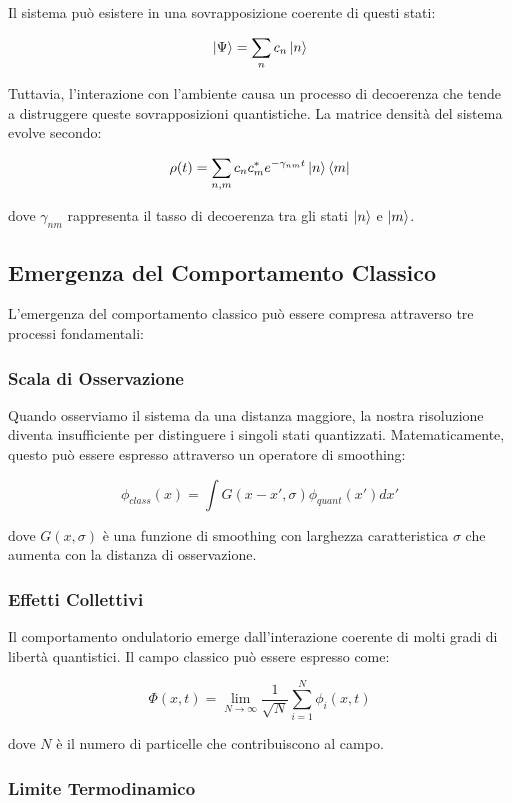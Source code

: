 \documentclass[a4paper,11pt]{article}
\begin{document}
Il sistema può esistere in una sovrapposizione coerente di questi stati:

\[\ket{\Psi} = \sum_n c_n \ket{n}\]

Tuttavia, l'interazione con l'ambiente causa un processo di decoerenza
che tende a distruggere queste sovrapposizioni quantistiche. La matrice
densità del sistema evolve secondo:

\[\rho(t) = \sum_{n,m} c_n c_m^* e^{-\gamma_{nm}t} \ket{n}\bra{m}\]

dove \(\gamma_{nm}\) rappresenta il tasso di decoerenza tra gli stati
\(\ket{n}\) e \(\ket{m}\).

\subsection{Emergenza del Comportamento
Classico}\label{emergenza-del-comportamento-classico}

L'emergenza del comportamento classico può essere compresa attraverso
tre processi fondamentali:

\subsubsection{Scala di Osservazione}\label{scala-di-osservazione}

Quando osserviamo il sistema da una distanza maggiore, la nostra
risoluzione diventa insufficiente per distinguere i singoli stati
quantizzati. Matematicamente, questo può essere espresso attraverso un
operatore di smoothing:

\[\phi_{class}(x) = \int G(x-x', \sigma) \phi_{quant}(x') dx'\]

dove \(G(x,\sigma)\) è una funzione di smoothing con larghezza
caratteristica \(\sigma\) che aumenta con la distanza di osservazione.

\subsubsection{Effetti Collettivi}\label{effetti-collettivi}

Il comportamento ondulatorio emerge dall'interazione coerente di molti
gradi di libertà quantistici. Il campo classico può essere espresso
come:

\[\Phi(x,t) = \lim_{N \to \infty} \frac{1}{\sqrt{N}} \sum_{i=1}^N \phi_i(x,t)\]

dove \(N\) è il numero di particelle che contribuiscono al campo.

\subsubsection{Limite Termodinamico}\label{limite-termodinamico}
\end{document}
